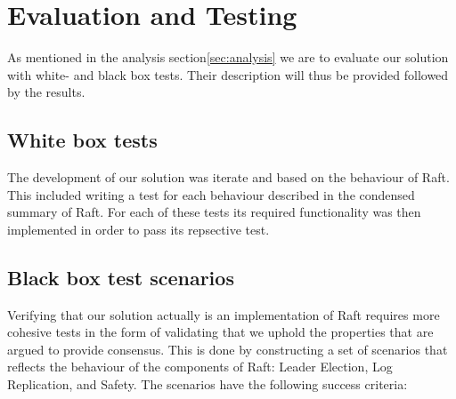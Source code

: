 \section{Evaluation and Testing} %
\label{sec:evaluation_and_testing}
As mentioned in the analysis section\ref{sec:analysis} we are to evaluate our solution with white- and black box tests. Their description will thus be provided followed by the results.


\subsection{White box tests}
The development of our solution was iterate and based on the behaviour of Raft. This included writing a test for each behaviour described in the condensed summary of Raft\cite{Raft}. For each of these tests its required functionality was then implemented in order to pass its repsective test. 


\subsection{Black box test scenarios}
Verifying that our solution actually is an implementation of Raft requires more cohesive tests in the form of validating that we uphold the properties that are argued to provide consensus. This is done by constructing a set of scenarios that reflects the behaviour of the components of Raft: Leader Election, Log Replication, and Safety. The scenarios have the following success criteria:


